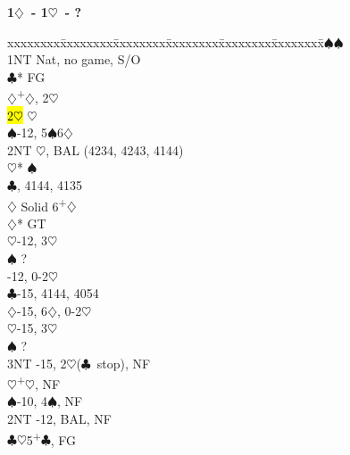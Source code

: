 \documentclass[10pt]{article}
\renewcommand{\c}{$\clubsuit$}
\renewcommand{\d}{$\diamondsuit$}
\newcommand{\h}{$\heartsuit$}
\newcommand{\s}{$\spadesuit$}
\newcommand{\p}{\textsuperscript{+}}
\newcommand{\m}{\textsuperscript{\textminus}}
\newenvironment{bidtable}[1][]
{\textbf{#1}
  \begin{adjustwidth}{1em}{}
    \addvspace{2pt}
    \begin{tabbing}
      xxxxxxxx\=xxxxxxxx\=xxxxxxxx\=xxxxxxxx\=xxxxxxxx\=xxxxxxxx\=\kill}
{\end{tabbing}\end{adjustwidth}\bigskip}%
\begin{document}
\begin{multicols*}{2}
\begin{bidtable}[1\d\ - 1\h\ - ?]
1\s             {}\s                                             \\
                \> 1NT  \> Nat, no game, S/O                       \\
                \c* \> FG                                      \\
                \>      \d      {}\p\d, 2\m\h                \\
                \>      \> \hl{2\h} \h                         \\
                \>      \s      {}-12, 5\s 6\d              \\
                \>      \> 2NT      \h, BAL (4234, 4243, 4144) \\
                \>      \>          \h* {}\s                 \\
                \>      \c      {}, 4144, 4135            \\
                \>      \d      \> Solid 6\p\d                 \\
                \d* \> GT                                      \\
                \>      \h      {}-12, 3\h                  \\
                \>      \s      \> ?                           \\
                \>      \NT     {}-12, 0-2\h                \\
                \>      \c      {}-15, 4144, 4054           \\
                \>      \d      {}-15, 6\d, 0-2\h           \\
                \>      \h      {}-15, 3\h                  \\
                \>      \s      \> ?                           \\
                \>      \> 3NT      -15, 2\h (\c\ stop), NF   \\
                \h  {}\p\h, NF                               \\
                \s  {}-10, 4\s, NF                           \\
                \> 2NT  -12, BAL, NF                          \\
                \c  {}\h 5\p\c, FG                           \\

\end{bidtable}
\end{multicols*}
\end{document}
